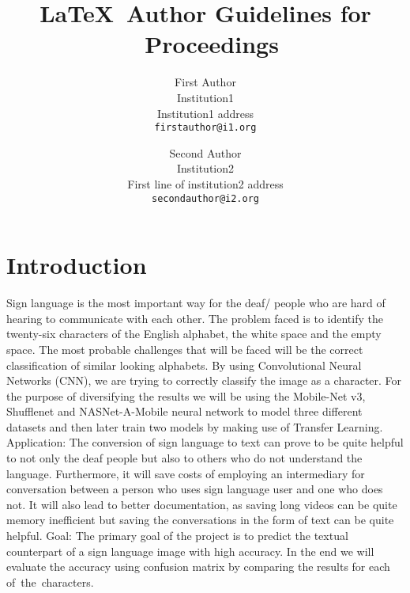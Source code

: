 \documentclass[10pt,twocolumn,letterpaper]{article}
\begin{document}
  \title{\LaTeX\ Author Guidelines for \confName~Proceedings}

  \author{First Author\\
  Institution1\\
  Institution1 address\\
  {\tt\small firstauthor@i1.org}
  \and
  Second Author\\
  Institution2\\
  First line of institution2 address\\
  {\tt\small secondauthor@i2.org}
  }
  \maketitle


  \section{Introduction}
  \label{sec:intro}

Sign language is the most important way for the deaf/ people who are hard of hearing to communicate with each other. The problem faced is to identify the twenty-six characters of the English alphabet, the white space and the empty space. The most probable challenges that will be faced will be the correct classification of similar looking alphabets. By using Convolutional Neural Networks (CNN), we are trying to correctly classify the image as a character. For the purpose of diversifying the results we will be using the Mobile-Net v3, Shufflenet and NASNet-A-Mobile neural network to model three different datasets and then later train two models by making use of Transfer Learning.
Application: The conversion of sign language to text can prove to be quite helpful to not only the deaf people but also to others who do not understand the language. Furthermore, it will save costs of employing an intermediary for conversation between a person who uses sign language user and one who does not. It will also lead to better documentation, as saving long videos can be quite memory inefficient but saving the conversations in the form of text can be quite helpful.
Goal: The primary goal of the project is to predict the textual counterpart of a sign language image with high accuracy. In the end we will evaluate the accuracy using confusion matrix by comparing the results for each of the characters.
\end{document}
